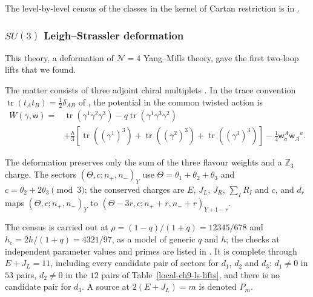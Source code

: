 \documentclass[11pt]{article}
\numberwithin{equation}{section}
\numberwithin{figure}{section}
\numberwithin{table}{section}
\begin{document}
The level-by-level census of the classes in the kernel of Cartan restriction is in \cite[supplement, Section S5.3]{Repo}.

\subsubsection{$SU(3)$ Leigh--Strassler deformation}\label{sec-results-LS}

This theory, a deformation of $\mathcal N=4$ Yang--Mills theory, gave the first two-loop lifts that we found.

The matter consists of three adjoint chiral multiplets \cite{LeighStrassler}. In the trace convention $\operatorname{tr}(t_At_B)=\tfrac12\delta_{AB}$ of \cite[results report, \S6.1]{Repo}, the potential in the common twisted action is
\begin{equation}\label{local-ch9-ls-action}
\begin{aligned}
\bar W(\gamma,\mathsf w)={}&
\operatorname{tr}(\gamma^1\gamma^2\gamma^3)
-q\operatorname{tr}(\gamma^1\gamma^3\gamma^2)\\
&+\frac h3\left[\operatorname{tr}((\gamma^1)^3)
+\operatorname{tr}((\gamma^2)^3)+\operatorname{tr}((\gamma^3)^3)\right]
-\frac14\mathsf w_{\dot a}^{A}\mathsf w_A{}^{\dot a}.
\end{aligned}
\end{equation}

The deformation preserves only the sum of the three flavour weights and a $\mathbb Z_3$ charge. The sectors $(\Theta,c;n_+,n_-)_Y$ use $\Theta=\theta_1+\theta_2+\theta_3$ and $c=\theta_2+2\theta_3\pmod3$; the conserved charges are $E$, $J_L$, $J_R$, $\sum_IR_I$ and $c$, and $d_r$ maps $(\Theta,c;n_+,n_-)_Y$ to $(\Theta-3r,c;n_++r,n_-+r)_{Y+1-r}$.

The census is carried out at $\rho=(1-q)/(1+q)=12345/678$ and $h_e=2h/(1+q)=4321/97$, as a model of generic $q$ and $h$; the checks at independent parameter values and primes are listed in \cite[supplement, Section S6.1]{Repo}. It is complete through $E+J_L=11$, including every candidate pair of sectors for $d_1$, $d_2$ and $d_3$: $d_1\ne0$ in $53$ pairs, $d_2\ne0$ in the $12$ pairs of Table~\ref{local-ch9-ls-lifts}, and there is no candidate pair for $d_3$. A source at $2(E+J_L)=m$ is denoted $P_m$.
\end{document}
